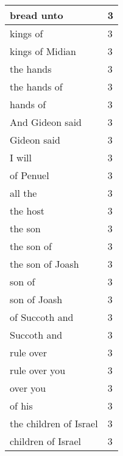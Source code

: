 \begin{center}
\begin{longtable}{|p{3.0in}|p{0.5in}|}
bread unto & 3\\ \hline 
kings of & 3\\ \hline 
kings of Midian & 3\\ \hline 
the hands & 3\\ \hline 
the hands of & 3\\ \hline 
hands of & 3\\ \hline 
And Gideon said & 3\\ \hline 
Gideon said & 3\\ \hline 
I will & 3\\ \hline 
of Penuel & 3\\ \hline 
all the & 3\\ \hline 
the host & 3\\ \hline 
the son & 3\\ \hline 
the son of & 3\\ \hline 
the son of Joash & 3\\ \hline 
son of & 3\\ \hline 
son of Joash & 3\\ \hline 
of Succoth and & 3\\ \hline 
Succoth and & 3\\ \hline 
rule over & 3\\ \hline 
rule over you & 3\\ \hline 
over you & 3\\ \hline 
of his & 3\\ \hline 
the children of Israel & 3\\ \hline 
children of Israel & 3\\ \hline 
\end{longtable}
\end{center}





